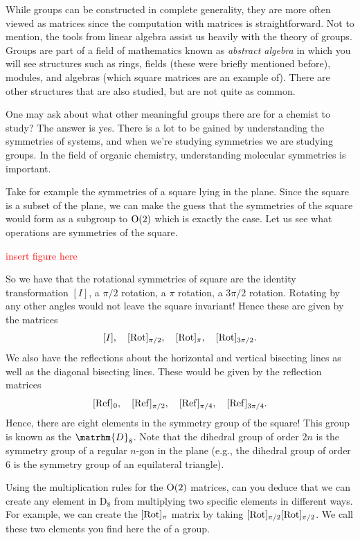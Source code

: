             While groups can be constructed in complete generality, they are more often viewed as matrices since the computation with matrices is straightforward. Not to mention, the tools from linear algebra assist us heavily with the theory of groups.  Groups are part of a field of mathematics known as \emph{abstract algebra} in which you will see structures such as rings, fields (these were briefly mentioned before), modules, and algebras (which square matrices are an example of). There are other structures that are also studied, but are not quite as common.  
            
            One may ask about what other meaningful groups there are for a chemist to study? The answer is yes.  There is a lot to be gained by understanding the symmetries of systems, and when we're studying symmetries we are studying groups. In the field of organic chemistry, understanding molecular symmetries is important.  
            
            Take for example the symmetries of a square lying in the plane. Since the square is a subset of the plane, we can make the guess that the symmetries of the square would form as a subgroup to $\mathrm{O}(2)$ which is exactly the case. Let us see what operations are symmetries of the square.
            
            \textcolor{red}{insert figure here}
            
            So we have that the rotational symmetries of square are the identity transformation $[I]$, a $\pi/2$ rotation, a $\pi$ rotation, a $3\pi/2$ rotation. Rotating by any other angles would not leave the square invariant! Hence these are given by the matrices
            \[
            [I],\quad [\mathrm{Rot}]_{\pi/2},\quad [\mathrm{Rot}]_{\pi}, \quad [\mathrm{Rot}]_{3\pi/2}.
            \]
            We also have the reflections about the horizontal and vertical bisecting lines as well as the diagonal bisecting lines.  These would be given by the reflection matrices
            \[
            [\mathrm{Ref}]_{0},\quad [\mathrm{Ref}]_{\pi/2}, \quad [\mathrm{Ref}]_{\pi/4}, \quad [\mathrm{Ref}]_{3\pi/4}.
            \]
            Hence, there are eight elements in the symmetry group of the square! This group is known as the  $\matrhm{D}_8$. Note that the dihedral group of order $2n$ is the symmetry group of a regular $n$-gon in the plane (e.g., the dihedral group of order 6 is the symmetry group of an equilateral triangle).
            
            \begin{exercise}
            Using the multiplication rules for the $\mathrm{O}(2)$ matrices, can you deduce that we can create any element in $\mathrm{D}_8$ from multiplying two specific elements in different ways. For example, we can create the $[\mathrm{Rot}]_\pi$ matrix by taking $[\mathrm{Rot}]_{\pi/2}[\mathrm{Rot}]_{\pi/2}$. We call these two elements you find here the   of a group.
            \end{exercise}
            
